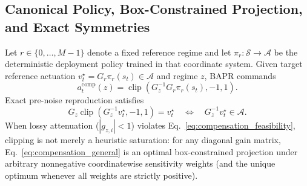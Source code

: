 \documentclass[twoside,11pt]{article}
\newcommand{\gain}{G}
\newcommand{\clip}{\operatorname{clip}}
\begin{document}
\subsection{Canonical Policy, Box-Constrained Projection, and Exact Symmetries}

Let $r\in\{0,\ldots,M-1\}$ denote a fixed reference regime and let $\pi_r:\mathcal{S}\to\mathcal{A}$ be the deterministic deployment policy trained in that coordinate system. Given target reference actuation $v_t^\star=\gain_r\pi_r(s_t)\in\mathcal{A}$ and regime $z$, BAPR commands
\begin{equation}
    a_t^{\mathrm{comp}}(z)
    = \clip\!\left(\gain_z^{-1}\gain_r\pi_r(s_t),-1,1\right).
    \label{eq:compensation_general}
\end{equation}
Exact pre-noise reproduction satisfies
\begin{equation}
 \gain_z\clip(\gain_z^{-1}v_t^\star,-1,1)=v_t^\star
 \quad\Longleftrightarrow\quad
 \gain_z^{-1}v_t^\star\in\mathcal{A}.
 \label{eq:compensation_feasibility}
\end{equation}
When lossy attenuation ($|g_{z,i}|<1$) violates Eq.~\eqref{eq:compensation_feasibility}, clipping is not merely a heuristic saturation: for any diagonal gain matrix, Eq.~\eqref{eq:compensation_general} is an optimal box-constrained projection under arbitrary nonnegative coordinatewise sensitivity weights (and the unique optimum whenever all weights are strictly positive).
\end{document}
